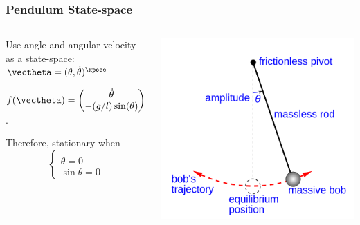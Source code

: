 \documentclass[12pt]{beamer}
\begin{document}
\begin{frame}
\frametitle{Pendulum State-space}

\begin{columns}

\begin{itemize}

\vitem
Use angle and angular velocity as a state-space:
$\vectheta = (\theta, \dot \theta)^\xpose$

\vitem
$f(\vectheta)
	= \begin{pmatrix}
		\dot\theta \\
		-(g/l) \sin(\theta)
	\end{pmatrix}$.

\vitem Therefore, stationary when
\[
\begin{cases}
\dot\theta = 0 \\
\sin \theta = 0
\end{cases}
\]

\end{itemize}
\vfill\null


\includegraphics[width=\linewidth]{Simple_gravity_pendulum.png}

\end{columns}

\end{frame}
\end{document}
